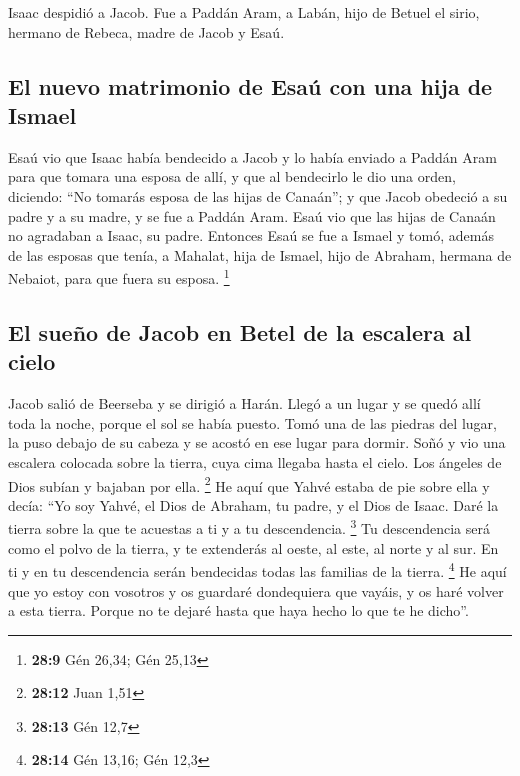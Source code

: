  Isaac despidió a Jacob. Fue a Paddán Aram, a Labán, hijo
de Betuel el sirio, hermano de Rebeca, madre de Jacob y Esaú.

\hypertarget{el-nuevo-matrimonio-de-esauxfa-con-una-hija-de-ismael}{%
\subsection{El nuevo matrimonio de Esaú con una hija de
Ismael}\label{el-nuevo-matrimonio-de-esauxfa-con-una-hija-de-ismael}}

 Esaú vio que Isaac había bendecido a Jacob y lo había
enviado a Paddán Aram para que tomara una esposa de allí, y que al
bendecirlo le dio una orden, diciendo: ``No tomarás esposa de las hijas
de Canaán'';  y que Jacob obedeció a su padre y a su
madre, y se fue a Paddán Aram.  Esaú vio que las hijas de
Canaán no agradaban a Isaac, su padre.  Entonces Esaú se
fue a Ismael y tomó, además de las esposas que tenía, a Mahalat, hija de
Ismael, hijo de Abraham, hermana de Nebaiot, para que fuera su esposa.
\footnote{\textbf{28:9} Gén 26,34; Gén 25,13}

\hypertarget{el-sueuxf1o-de-jacob-en-betel-de-la-escalera-al-cielo}{%
\subsection{El sueño de Jacob en Betel de la escalera al
cielo}\label{el-sueuxf1o-de-jacob-en-betel-de-la-escalera-al-cielo}}

 Jacob salió de Beerseba y se dirigió a Harán.
 Llegó a un lugar y se quedó allí toda la noche, porque
el sol se había puesto. Tomó una de las piedras del lugar, la puso
debajo de su cabeza y se acostó en ese lugar para dormir.
 Soñó y vio una escalera colocada sobre la tierra, cuya
cima llegaba hasta el cielo. Los ángeles de Dios subían y bajaban por
ella. \footnote{\textbf{28:12} Juan 1,51}  He aquí que
Yahvé estaba de pie sobre ella y decía: ``Yo soy Yahvé, el Dios de
Abraham, tu padre, y el Dios de Isaac. Daré la tierra sobre la que te
acuestas a ti y a tu descendencia. \footnote{\textbf{28:13} Gén 12,7}
 Tu descendencia será como el polvo de la tierra, y te
extenderás al oeste, al este, al norte y al sur. En ti y en tu
descendencia serán bendecidas todas las familias de la tierra.
\footnote{\textbf{28:14} Gén 13,16; Gén 12,3}  He aquí
que yo estoy con vosotros y os guardaré dondequiera que vayáis, y os
haré volver a esta tierra. Porque no te dejaré hasta que haya hecho lo
que te he dicho''.

